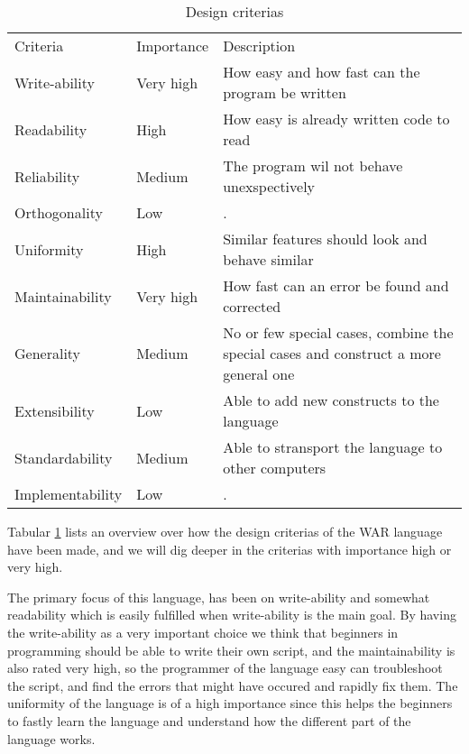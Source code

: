 \begin{table}[H]
	\begin{tabular}{l l p{7cm}}
	Criteria			&	Importance	&		Description	\\		
	Write-ability 		& 	Very high	&		How easy and how fast can the program be written\\
	Readability			& 	High		&		How easy is already written code to read\\
	Reliability			& 	Medium		&		The program wil not behave unexspectively\\
	Orthogonality		& 	Low			&		.\\
	Uniformity			& 	High		&		Similar features should look and behave similar\\
	Maintainability		& 	Very high	&		How fast can an error be found and corrected\\
	Generality			& 	Medium		&		No or few special cases, combine the special cases and construct a more general one\\
	Extensibility		& 	Low			&		Able to add new constructs to the language\\
	Standardability		& 	Medium		&		Able to stransport the language to other computers\\
	Implementability	& 	Low			&		.\\
	\end{tabular}
	\caption{Design criterias}
	\label{tab:criteria_tabular}
\end{table}


Tabular \ref{tab:criteria_tabular} lists an overview over how the design criterias of the WAR language have been made, and we will dig deeper in the criterias with importance high or very high.

The primary focus of this language, has been on write-ability and somewhat readability which is easily fulfilled when write-ability is the main goal. By having the write-ability as a very important choice we think that beginners in programming should be able to write their own script, and the maintainability is also rated very high, so the programmer of the language easy can troubleshoot the script, and find the errors that might have occured and rapidly fix them. The uniformity of the language is of a high importance since this helps the beginners to fastly learn the language and understand how the different part of the language works.


